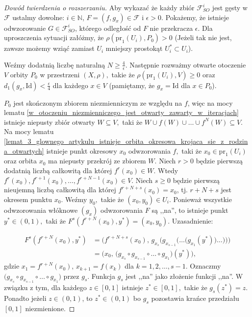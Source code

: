 \documentclass[licencjacka]{pwr_wmat_praca_dyplomowa}
\theoremstyle{plain}
\numberwithin{theorem}{chapter}
\theoremstyle{definition}
\numberwithin{theorem}{chapter}
\begin{document}
\begin{proof}[Dowód twierdzenia o rozszerzaniu]
Aby wykazać że każdy zbiór $\mathcal{F}_{SO}^i$ jest gęsty w $\mathcal{F}$ ustalmy dowolne: $i \in \mathbb{N}$, $F=(f,g_x) \in \mathcal{F}$ i $\epsilon > 0$. Pokażemy, że istnieje odwzorowanie $G \in \mathcal{F}_{SO}^i$, którego odległość od $F$ nie przekracza $\epsilon$. Dla uproszczenia sytuacji załóżmy, że $\rho(\textrm{pr}_1(U_i), P_0) > 0$ (Jeżeli tak nie jest, zawsze możemy wziąć zamiast $U_i$ mniejszy prostokąt $U_i^* \subset U_i$).

Weźmy dodatnią liczbę naturalną $N \geq \frac{4}{\epsilon}$. Następnie rozważmy otwarte otoczenie $V$ orbity $P_0$ w przestrzeni $(X, \rho),$ takie że $\rho(\textrm{pr}_1(U_i), V) \geq 0$ oraz $d_1(g_x, \textrm{Id}) < \frac{\epsilon}{4}$ dla każdego $x \in V$ (pamiętamy, że $g_x = \textrm{Id}$ dla $x \in P_0$).

$P_0$ jest skończonym zbiorem niezmienniczym ze względu na $f$, więc na mocy lematu \ref{w_otoczeniu_niezmienniczego_jest_otwarty_zawarty_w_iteracjach} istnieje niepusty zbiór otwarty $W \subseteq V,$ taki że $W \cup f(W) \cup \ldots \cup f^N(W) \subseteq V$. Na mocy lematu \ref{lemat_3_glownego_artykulu_istnieje_orbita_okresowa_krojaca_sie_z_rodzina_otwartych} istnieje punkt okresowy $x_0$ odwzorowania $f,$ taki że $x_0 \in \textrm{pr}_1(U_i)$ oraz orbita $x_0$ ma niepusty przekrój ze zbiorem $W$. Niech $r > 0$ będzie pierwszą dodatnią liczbą całkowitą dla której $f^r(x_0) \in W$. Wtedy $f^r(x_0), f^{r+1}(x_0), \ldots, f^{r+N-1}(x_0) \in V$. Niech $s \geq 0$ będzie pierwszą nieujemną liczbą całkowitą dla której $f^{r+N+s}(x_0) = x_0$, tj. $r+N+s$ jest okresem punktu $x_0$. Weźmy $y_0,$ takie że $(x_0, y_0) \in U_i$. Ponieważ wszystkie odwzorowania włóknowe $(g_x)$ odwzorowania $F$ są ,,na'', to istnieje punkt $y^* \in (0,1),$ taki że $F^s(f^{r+N}(x_0), y^*) = (x_0, y_0)$. Uzasadnienie:


\begin{equation}
\begin{aligned}
F^s\left(f^{r+N}(x_0), y^*\right) & = \Big( f^{r+N+s}(x_0), \, g_{x_s}\big(g_{x_{s-1}}\big( \ldots \big(g_{x_1}(y^*)\big) \ldots \big)\big) \Big) \\
& = \Big( x_0, \, \big(g_{x_s} \circ g_{x_{s-1}} \circ \ldots \circ g_{x_1} \big)(y^*) \Big),
\end{aligned}
\end{equation}
gdzie $x_1 = f^{r+N}(x_0), \, x_{k+1} = f(x_k)$ dla $k=1,2,\ldots,s-1.$
Oznaczmy  $\big(g_{x_s} \circ g_{x_{s-1}} \circ \ldots \circ g_{x_1} \big)$ przez $g_s.$ Funkcja $g_s$ jest ,,na'' jako złożenie funkcji ,,na''. W związku z tym, dla każdego $z \in [0,1]$ istnieje $z^* \in [0,1],$ takie że $g_s(z^*) = z.$ Ponadto jeżeli $z \in (0,1)$, to $z^* \in (0,1)$ bo $g_s$ pozostawia krańce przedziału $[0,1]$ niezmienione.




\end{proof}
\end{document}
